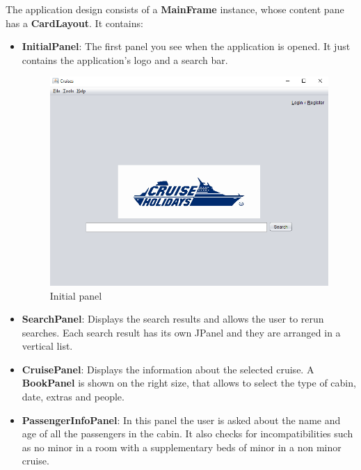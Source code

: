 \documentclass[12pt]{article}
\begin{document}
   The application design consists of a \textbf{MainFrame} instance, whose content pane has a \textbf{CardLayout}. It contains:
   \begin{itemize}
	    \item \textbf{InitialPanel}: The first panel you see when the application is opened. It just contains the application's  logo and a search bar.
	    \begin{figure}[h]
		   	\includegraphics[width=\linewidth]{images/initial.png}
		   	\caption{Initial panel}
		   	\label{fig:initial}
	    \end{figure}
   	    \item \textbf{SearchPanel}: Displays the search results and allows the user to rerun searches. Each search result has its own JPanel and they are arranged in a vertical list. 
   	    \begin{figure}
   	    \end{figure}
	    \item \textbf{CruisePanel}: Displays the information about the selected cruise. A \textbf{BookPanel} is shown on the right size, that allows to select the type of cabin, date, extras and people.
	    \begin{figure}
	    \end{figure}
   	    \item \textbf{PassengerInfoPanel}: In this panel the user is asked about the name and age of all the passengers in the cabin. It also checks for incompatibilities such as no minor in a room with a supplementary beds of minor in a non minor cruise.

\end{itemize}
\end{document}

